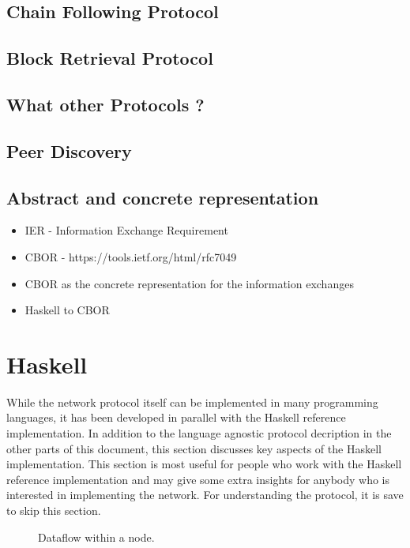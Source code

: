 \documentclass{report}
\theoremstyle{definition}{
  \newtheorem{lemma}{Lemma}[section] %
  \newtheorem{definition}[lemma]{Definition}
}
\theoremstyle{theorem}{
  \newtheorem{invariant}[lemma]{Invariant}
  \newtheorem{proofobligation}[lemma]{Proof Obligation}
}
\numberwithin{equation}{lemma}
\begin{document}
\section{Chain Following Protocol}
\section{Block Retrieval Protocol}
\section{What other Protocols ?}
\section{Peer Discovery}
\section{Abstract and concrete representation}
\label{CBOR-section}
\begin{itemize}
  \item IER - Information Exchange Requirement
  \item CBOR - https://tools.ietf.org/html/rfc7049
\end{itemize}

\begin{itemize}
  \item CBOR as the concrete representation for the information exchanges
  \item Haskell to CBOR 
\end{itemize}

\chapter{Haskell}
While the network protocol itself can be implemented in many programming languages,
it has been developed in parallel with the Haskell reference implementation.
In addition to the language agnostic protocol decription in the other parts of this document,
this section discusses key aspects of the Haskell implementation.
This section is most useful for people who work with the Haskell reference implementation and
may give some extra insights for anybody who is interested in implementing the network.
For understanding the protocol, it is save to skip this section.
\begin{figure}
\begin{center}
\end{center}
\caption{Dataflow within a node.}
\label{node-diagram-concurency}
\end{figure}
\end{document}
